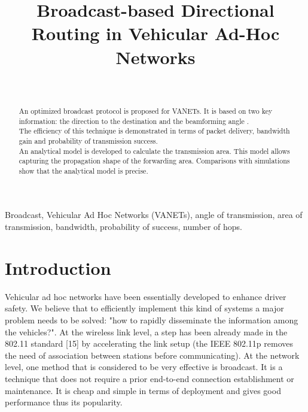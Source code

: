 \documentclass{IEEEtran}
\begin{document}
\title{Broadcast-based Directional Routing in Vehicular Ad-Hoc Networks}


{
\author{\\
}
}

\maketitle

\begin{abstract}
An optimized broadcast protocol is proposed for VANETs. It is based
on two key information: the direction to the destination and
the beamforming angle .\\
The efficiency of this technique is demonstrated in terms of packet
delivery, bandwidth gain and probability of transmission success.\\
An analytical model is developed to calculate the transmission area.
This model allows capturing the propagation shape of the forwarding
area. Comparisons with simulations show that the analytical model is
precise.\\

\end{abstract}

\begin{keywords}
Broadcast, Vehicular Ad Hoc Networks (VANETs), angle of
transmission, area of transmission, bandwidth, probability of
success, number of hops.
\end{keywords}

\IEEEpeerreviewmaketitle

\section{Introduction}


Vehicular ad hoc networks have been essentially developed  to
enhance driver safety. We believe that to efficiently implement this
kind of systems a major problem needs to be solved: "how to rapidly
disseminate the information among the vehicles?". At the wireless
link level, a step has been already made in the 802.11 standard [15]
by accelerating the link setup (the IEEE 802.11p removes the need of
association between stations before communicating). At the network
level, one method that is considered to be very effective is
broadcast. It is a technique that does not require a prior
end-to-end connection establishment or maintenance. It is cheap and
simple in terms of deployment
and gives good performance thus its popularity.\\
\end{document}
